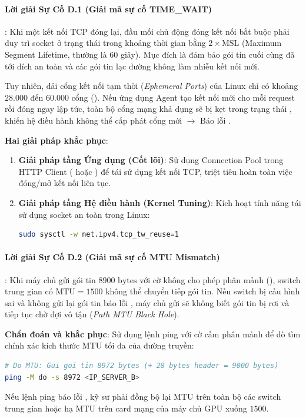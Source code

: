\paragraph{Lời giải Sự Cố D.1 (Giải mã sự cố TIME\_WAIT)}:
Khi một kết nối TCP đóng lại, đầu mối chủ động đóng kết nối bắt buộc phải duy trì socket ở trạng thái  trong khoảng thời gian bằng $2 \times \text{MSL}$ (Maximum Segment Lifetime, thường là 60 giây). Mục đích là đảm bảo gói tin  cuối cùng đã tới đích an toàn và các gói tin lạc đường không làm nhiễu kết nối mới. 

Tuy nhiên, dải cổng kết nối tạm thời (\textit{Ephemeral Ports}) của Linux chỉ có khoảng $28.000$ đến $60.000$ cổng (). Nếu ứng dụng Agent tạo kết nối mới cho mỗi request rồi đóng ngay lập tức, toàn bộ cổng mạng khả dụng sẽ bị kẹt trong trạng thái , khiến hệ điều hành không thể cấp phát cổng mới $\rightarrow$ Báo lỗi .

\textbf{Hai giải pháp khắc phục}:
\begin{enumerate}
  \item \textbf{Giải pháp tầng Ứng dụng (Cốt lõi)}: Sử dụng Connection Pool trong HTTP Client ( hoặc ) để tái sử dụng kết nối TCP, triệt tiêu hoàn toàn việc đóng/mở kết nối liên tục.
  \item \textbf{Giải pháp tầng Hệ điều hành (Kernel Tuning)}: Kích hoạt tính năng tái sử dụng socket  an toàn trong Linux:
  \begin{lstlisting}[language=bash]
  sudo sysctl -w net.ipv4.tcp_tw_reuse=1
  \end{lstlisting}
\end{enumerate}

\paragraph{Lời giải Sự Cố D.2 (Giải mã sự cố MTU Mismatch)}:
Khi máy chủ gửi gói tin $8900\text{ bytes}$ với cờ không cho phép phân mảnh (), switch trung gian có $\text{MTU} = 1500$ không thể chuyển tiếp gói tin. Nếu switch bị cấu hình sai và không gửi lại gói tin báo lỗi , máy chủ gửi sẽ không biết gói tin bị rơi và tiếp tục chờ đợi vô tận (\textit{Path MTU Black Hole}).

\textbf{Chẩn đoán và khắc phục}:
Sử dụng lệnh ping với cờ cấm phân mảnh để dò tìm chính xác kích thước MTU tối đa của đường truyền:
\begin{lstlisting}[language=bash]
# Do MTU: Gui goi tin 8972 bytes (+ 28 bytes header = 9000 bytes)
ping -M do -s 8972 <IP_SERVER_B>
\end{lstlisting}
Nếu lệnh ping báo lỗi , kỹ sư phải đồng bộ lại MTU trên toàn bộ các switch trung gian hoặc hạ MTU trên card mạng của máy chủ GPU xuống $1500$.
